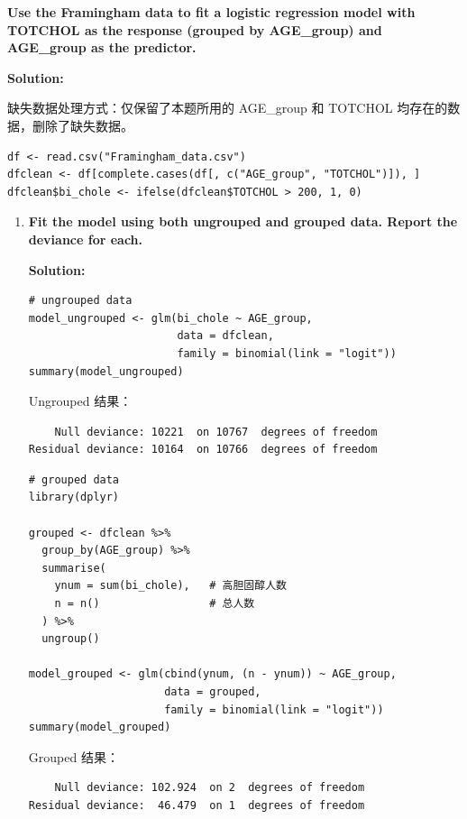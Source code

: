 \textbf{Use the Framingham data to fit a logistic regression model with TOTCHOL as the response (grouped by AGE\_group) and AGE\_group as the predictor.}

\textbf{Solution:}

缺失数据处理方式：仅保留了本题所用的 AGE\_group 和 TOTCHOL 均存在的数据，删除了缺失数据。

\begin{lstlisting}[caption={Data Preparation}]
df <- read.csv("Framingham_data.csv")
dfclean <- df[complete.cases(df[, c("AGE_group", "TOTCHOL")]), ]
dfclean$bi_chole <- ifelse(dfclean$TOTCHOL > 200, 1, 0)
\end{lstlisting}

\begin{enumerate}
\item[(a)] \textbf{Fit the model using both ungrouped and grouped data. Report the deviance for each.}

\textbf{Solution:}

\begin{lstlisting}[caption={Ungrouped Data Analysis}]
# ungrouped data
model_ungrouped <- glm(bi_chole ~ AGE_group,
                       data = dfclean,
                       family = binomial(link = "logit"))
summary(model_ungrouped)
\end{lstlisting}

Ungrouped 结果：
\begin{verbatim}
    Null deviance: 10221  on 10767  degrees of freedom
Residual deviance: 10164  on 10766  degrees of freedom
\end{verbatim}

\begin{lstlisting}[caption={Grouped Data Analysis}]
# grouped data
library(dplyr)

grouped <- dfclean %>%
  group_by(AGE_group) %>%
  summarise(
    ynum = sum(bi_chole),   # 高胆固醇人数
    n = n()                 # 总人数
  ) %>%
  ungroup()

model_grouped <- glm(cbind(ynum, (n - ynum)) ~ AGE_group,
                     data = grouped,
                     family = binomial(link = "logit"))
summary(model_grouped)
\end{lstlisting}

Grouped 结果：
\begin{verbatim}
    Null deviance: 102.924  on 2  degrees of freedom
Residual deviance:  46.479  on 1  degrees of freedom
\end{verbatim}


\end{enumerate}
